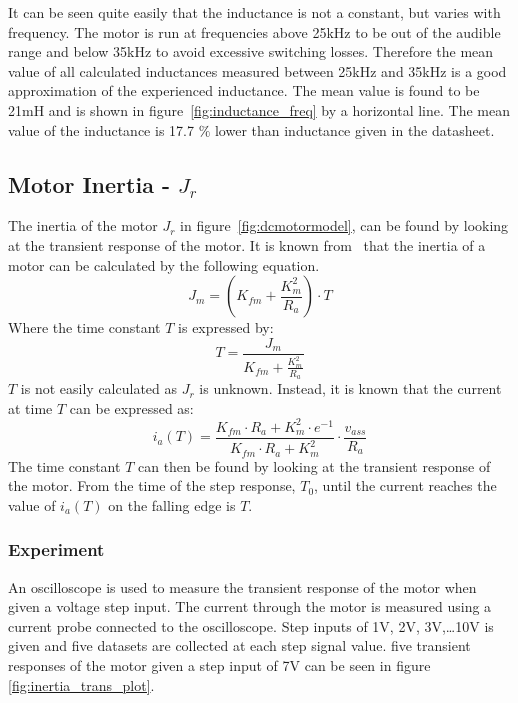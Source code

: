 It can be seen quite easily that the inductance is not a constant, but varies with frequency. 
The motor is run at frequencies above 25kHz to be out of the audible range and below 35kHz to avoid excessive switching losses. 
Therefore the mean value of all calculated inductances measured between 25kHz and 35kHz is a good approximation of the experienced inductance.
The mean value is found to be 21mH and is shown in figure~\ref{fig:inductance_freq} by a horizontal line.
The mean value of the inductance is 17.7 $\%$ lower than inductance given in the datasheet.	

\subsection{Motor Inertia - $J_r$}
\label{sec:inertia}
The inertia of the motor $J_r$ in figure~\ref{fig:dcmotormodel}, can be found by looking at the transient response of the motor. 
It is known from~\cite{feedback} that the inertia of a motor can be calculated by the following equation.
$$J_m = (K_{fm}+\frac{K_m^2}{R_a}) \cdot T$$
Where the time constant $T$ is expressed by:
$$ T = \frac{J_m}{K_{fm}+\frac{K_m^2}{R_a}}$$
$T$ is not easily calculated as $J_r$ is unknown. Instead, it is known that the current at time $T$ can be expressed as:
$$ i_a(T) = \frac{K_{fm} \cdot R_a + K_m^2 \cdot e^{-1}}{K_{fm} \cdot R_a + K_m^2} \cdot \frac{v_{ass}}{R_a} $$
The time constant $T$ can then be found by looking at the transient response of the motor. 
From the time of the step response, $T_0$, until the current reaches the value of $i_a(T)$ on the falling edge is $T$.

\subsubsection{Experiment}
An oscilloscope is used to measure the transient response of the motor when given a voltage step input.
The current through the motor is measured using a current probe connected to the oscilloscope.
Step inputs of 1V, 2V, 3V,\dots 10V is given and five datasets are collected at each step signal value.  
five transient responses of the motor given a step input of 7V can be seen in figure \ref{fig:inertia_trans_plot}.


